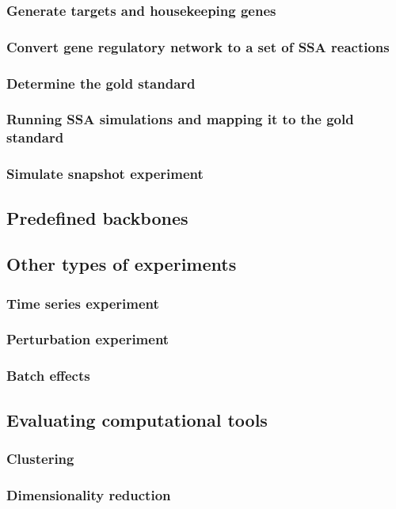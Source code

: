 \subsubsection{Generate targets and housekeeping genes}
\subsubsection{Convert gene regulatory network to a set of SSA reactions}
\subsubsection{Determine the gold standard}
\subsubsection{Running SSA simulations and mapping it to the gold standard}
\subsubsection{Simulate snapshot experiment}
\subsection{Predefined backbones}

\subsection{Other types of experiments}
\subsubsection{Time series experiment}
\subsubsection{Perturbation experiment}
\subsubsection{Batch effects}
\subsection{Evaluating computational tools}
\subsubsection{Clustering}
\subsubsection{Dimensionality reduction}
